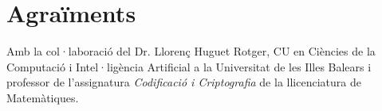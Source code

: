 \documentclass[journal]{IEEEtran}
\begin{document}

%


\appendices


\section*{Agraïments}
Amb la col·laboració del Dr. Llorenç Huguet Rotger, CU en Ciències de la Computació i Intel·ligència Artificial a la Universitat de les Illes Balears i professor de l'assignatura \textit{Codificació i Criptografia} de la llicenciatura de Matemàtiques.
\end{document}
